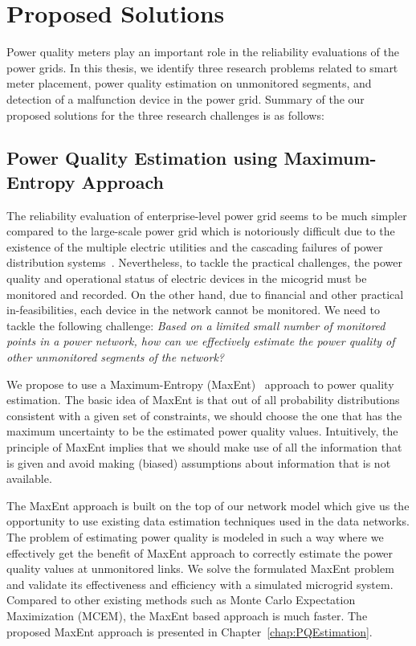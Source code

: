 \section{Proposed Solutions}
Power quality meters play an important role in the reliability evaluations of the power grids. In this thesis, we identify three research problems related to smart meter placement, power quality estimation on unmonitored segments, and detection of a malfunction device in the power grid. Summary of the our proposed solutions for the three research challenges is as follows:

\subsection{Power Quality Estimation using Maximum-Entropy Approach}
The reliability evaluation of enterprise-level power grid seems to be much simpler compared to the large-scale power grid which is notoriously difficult due to the existence of the multiple electric utilities and the cascading failures of power distribution systems~\cite{Albert04}. Nevertheless, to tackle the practical challenges, the power quality and operational status of electric devices in the micogrid must be monitored and recorded. On the other hand, due to financial and other practical in-feasibilities, each device in the network cannot be monitored. We need to tackle the following challenge: \textit{Based on a limited small number of monitored points in a power network, how can we effectively estimate the power quality of other unmonitored segments of the network?}

We propose to use a Maximum-Entropy (MaxEnt)~\cite{maxent} approach to power quality estimation. The basic idea of MaxEnt is that out of all probability distributions consistent with a given set of constraints, we should choose the one that has the maximum uncertainty to be the estimated power quality values. Intuitively, the principle of MaxEnt implies that we should make use of all the information that is given and avoid making (biased) assumptions about information that is not available.

The MaxEnt approach is built on the top of our network model which give us the opportunity to use existing data estimation techniques used in the data networks. The problem of estimating power quality is modeled in such a way where we effectively get the benefit of MaxEnt approach to correctly estimate the power quality values at unmonitored links. We solve the formulated MaxEnt problem and validate its effectiveness and efficiency with a simulated microgrid system. Compared to other existing methods such as Monte Carlo Expectation Maximization (MCEM), the MaxEnt based approach is much faster. The proposed MaxEnt approach is presented in Chapter~\ref{chap:PQEstimation}.


